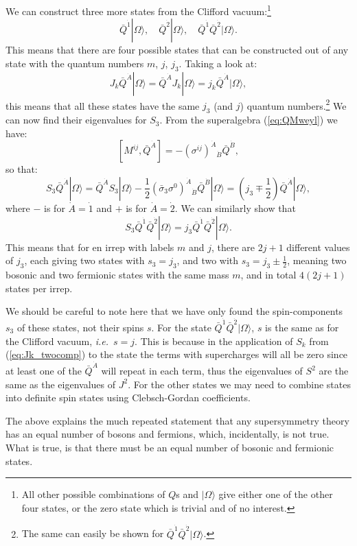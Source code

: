 \documentclass[notes.tex]{subfiles}
\begin{document}
We can construct three more states from the Clifford vacuum:\footnote{All other possible combinations of $Q$s and $|\Omega\rangle$ give either one of the other four states, or the zero state which is trivial and of no interest.}
\[\bar{Q}^{\dot{1}}|\Omega\rangle,\quad\bar{Q}^{\dot{2}}|\Omega\rangle,\quad\bar{Q}^{\dot{1}}\bar{Q}^{\dot{2}}|\Omega\rangle.\]
This means that there are four possible states that can be constructed out of any state with the quantum numbers $m$, $j$, $j_3$. Taking a look at:
\[J_k \bar{Q}^{\dot{A}}|\Omega\rangle = \bar{Q}^{\dot{A}}J_k |\Omega\rangle = j_k\bar{Q}^{\dot{A}}|\Omega\rangle,\]
this means that all these states have the same $j_3$ (and $j$) quantum numbers.\footnote{The same can easily be shown for $\bar{Q}^{\dot{1}}\bar{Q}^{\dot{2}}|\Omega\rangle$.} 
We can now find their eigenvalues for $S_3$. From the superalgebra (\ref{eq:QMweyl}) we have:
\[[M^{ij}, \bar{Q}^{\dot{A}}] = -(\sigma^{ij})^{\dot{A}}{}_{\dot{B}}\bar{Q}^{\dot{B}},\]
so that:
\[S_3\bar{Q}^{\dot{A}}|\Omega\rangle = \bar{Q}^{\dot{A}}S_3|\Omega\rangle - \frac{1}{2}(\bar{\sigma}_3\sigma^0)^{\dot{A}}{}_{\dot{B}}\bar{Q}^{\dot{B}}|\Omega\rangle = \left(j_3\mp \frac{1}{2}\right) \bar{Q}^{\dot{A}}|\Omega\rangle,\]
where $-$ is for $\dot{A}=\dot{1}$ and $+$ is for $\dot{A}=\dot{2}$. We can similarly show that
\[S_3\bar{Q}^{\dot{1}}\bar{Q}^{\dot{2}}|\Omega\rangle = j_3\bar{Q}^{\dot{1}}\bar{Q}^{\dot{2}}|\Omega\rangle.\]
This means that for en irrep with labels $m$ and $j$, there are $2j+1$ different values of $j_3$, each giving two states with $s_3 = j_3$, and two with $s_3 = j_3\pm\frac{1}{2}$, meaning two bosonic and two fermionic states with the same mass $m$, and in total $4(2j+1)$ states per irrep. 

We should be careful to note here that we have only found the spin-components $s_3$ of these states, not their spins $s$. For the state $\bar{Q}^{\dot{1}}\bar{Q}^{\dot{2}}|\Omega\rangle$, $s$ is the same as for the Clifford vacuum, {\it i.e.}\ $s=j$. This is because in the application of $S_k$ from (\ref{eq:Jk_twocomp}) to the state the terms with supercharges will all be zero since at least one of the  $\bar{Q}^{\dot{A}}$ will repeat in each term, thus the eigenvalues of $S^2$ are the same as the eigenvalues of $J^2$. For the other states we may need to combine states into definite spin states using Clebsch-Gordan coefficients.

The above explains the much repeated statement that any supersymmetry theory has an equal number of bosons and fermions, which, incidentally, is not true. What is true, is that there must be an equal number of bosonic and fermionic states.
\end{document}
